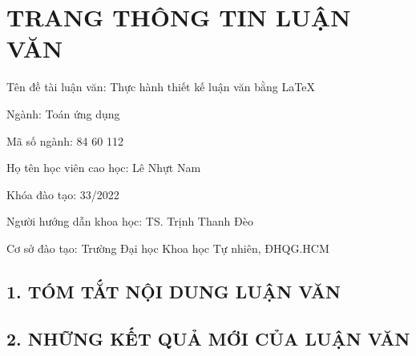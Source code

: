 \chapter*{TRANG THÔNG TIN LUẬN VĂN}

\begin{flushleft}
Tên đề tài luận văn: Thực hành thiết kế luận văn bằng \LaTeX

Ngành: Toán ứng dụng

Mã số ngành: 84 60 112

Họ tên học viên cao học: Lê Nhựt Nam

Khóa đào tạo: 33/2022

Người hướng dẫn khoa học: TS. Trịnh Thanh Đèo

Cơ sở đào tạo: Trường Đại học Khoa học Tự nhiên, ĐHQG.HCM 
\end{flushleft}

\section*{1. TÓM TẮT NỘI DUNG LUẬN VĂN}
\lipsum[1-2]

\section*{2. NHỮNG KẾT QUẢ MỚI CỦA LUẬN VĂN}
\lipsum[1-2]

